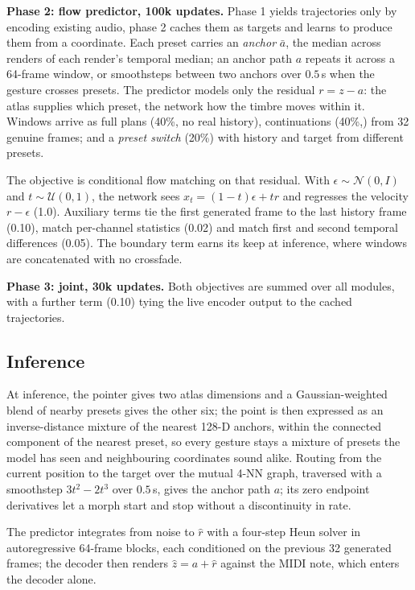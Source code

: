 \documentclass{article}
\begin{document}
\noindent\textbf{Phase 2: flow predictor, 100k updates.}
Phase 1 yields trajectories only by encoding existing audio, phase 2 caches them as targets and learns to produce
them from a coordinate. Each preset carries an \emph{anchor} $\bar{a}$,
the median across renders of each render's temporal median; an anchor
path $a$ repeats it across a 64-frame window, or smoothsteps between two
anchors over $0.5$\,s when the gesture crosses presets. The predictor
models only the residual $r = z - a$: the atlas supplies which preset,
the network how the timbre moves within it. Windows arrive as full plans
(40\%, no real history), continuations (40\%,) from 32 genuine frames; and a \emph{preset switch} (20\%) with history and target from different presets. 

The objective is conditional flow matching on that residual. With
$\epsilon \sim \mathcal{N}(0,I)$ and $t \sim \mathcal{U}(0,1)$, the
network sees $x_t = (1-t)\epsilon + t r$ and regresses the velocity
$r - \epsilon$ (1.0). Auxiliary terms tie the first generated frame to
the last history frame (0.10), match per-channel statistics (0.02) and
match first and second temporal differences (0.05). The boundary term
earns its keep at inference, where windows are concatenated with no
crossfade.

\noindent\textbf{Phase 3: joint, 30k updates.} Both objectives are summed over all modules, with a further term (0.10)
tying the live encoder output to the cached trajectories.

\subsection{Inference}\label{sec:inference}

At inference, the pointer
gives two atlas dimensions and a Gaussian-weighted blend of nearby
presets gives the other six; the point is then expressed as an
inverse-distance mixture of the nearest 128-D anchors, within the
connected component of the nearest preset, so every gesture stays a
mixture of presets the model has seen and neighbouring coordinates sound
alike. Routing from the current position to the target over the mutual
4-NN graph, traversed with a smoothstep $3t^2-2t^3$ over $0.5$\,s, gives
the anchor path $a$; its zero endpoint derivatives let a morph start and
stop without a discontinuity in rate.

The predictor integrates from noise to $\hat{r}$ with a four-step Heun
solver in autoregressive 64-frame blocks, each conditioned on the
previous 32 generated frames; the decoder then renders
$\hat{z} = a + \hat{r}$ against the MIDI note, which enters the decoder
alone.
\end{document}
